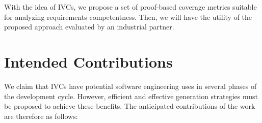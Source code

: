 With the idea of IVCs, we propose a set of proof-based coverage metrics suitable for analyzing requirements competentness. Then, we will have the utility of the proposed approach evaluated by an industrial partner.


\section{Intended Contributions}
 We claim that IVCs have potential software engineering uses in several phases of the development cycle. However, efficient and effective generation strategies must be proposed to achieve these benefits. The anticipated contributions of the work are therefore as follows:
